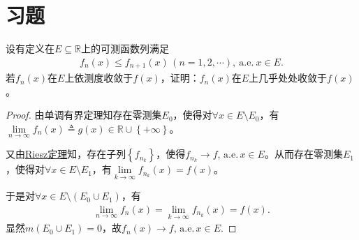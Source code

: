 \documentclass[../../main.tex]{subfiles}%
\begin{document}
\section{习题}

\begin{example}
设有定义在$E\subseteq \mathbb{R}$上的可测函数列满足
\begin{align*}
f_n(x)\leqslant f_{n+1}(x)\,(n=1,2,\cdots),\ \mathrm{a.e.}\ x\in E.
\end{align*}
若$f_n(x)$在$E$上依测度收敛于$f(x)$，证明：$f_n(x)$在$E$上几乎处处收敛于$f(x)$。
\end{example}
\begin{proof}
由单调有界定理知存在零测集$E_0$，使得对$\forall x\in E\setminus E_0$，有$\lim\limits_{n\to \infty}f_n\left(x\right)\triangleq g\left(x\right)\in \mathbb{R}\cup \left\{+\infty\right\}$。

又由\hyperref[theorem:Riesz定理]{Riesz定理}知，存在子列$\left\{f_{n_k}\right\}$，使得$f_{n_k}\to f,\,\mathrm{a.e.}\,x\in E$。从而存在零测集$E_1$，使得对$\forall x\in E\setminus E_1$，有$\lim\limits_{k\to \infty}f_{n_k}\left(x\right)=f\left(x\right)$。

于是对$\forall x\in E\setminus \left(E_0\cup E_1\right)$，有
\begin{align*}
\lim\limits_{n\to \infty}f_n\left(x\right)=\lim\limits_{k\to \infty}f_{n_k}\left(x\right)=f\left(x\right).
\end{align*}
显然$m\left(E_0\cup E_1\right)=0$，故$f_n\left(x\right)\to f,\,\mathrm{a.e.}\,x\in E$.
\end{proof}
\end{document}
